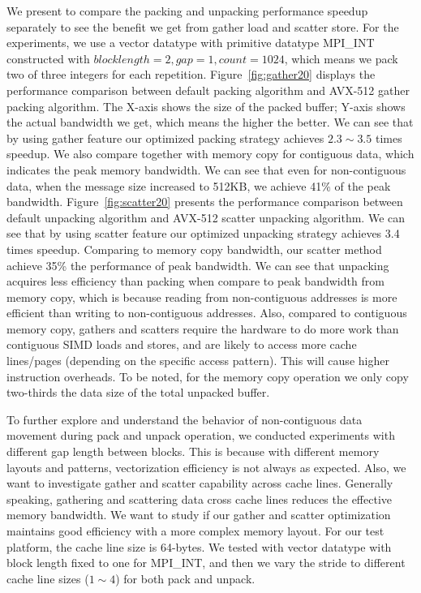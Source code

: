 \documentclass[conference]{IEEEtran}
\begin{document}
We present to compare the packing and unpacking performance speedup separately to see the benefit we get from gather load and scatter store. For the experiments, we use a vector datatype with primitive datatype MPI\_INT constructed with $block length = 2, gap = 1, count = 1024$, which means we pack two of three integers for each repetition.
Figure~\ref{fig:gather20} displays the performance comparison between \ompi default packing algorithm and AVX-512 gather packing algorithm. The X-axis shows the size of the packed buffer; Y-axis shows the actual bandwidth we get, which means the higher the better. We can see that by using gather feature our optimized packing strategy achieves $2.3 \sim 3.5$ times speedup. We also compare together with memory copy for contiguous data, which indicates the peak memory bandwidth. We can see that even for non-contiguous data, when the message size increased to 512KB, we achieve 41\% of the peak bandwidth.
Figure~\ref{fig:scatter20} presents the performance comparison between \ompi default unpacking algorithm and AVX-512 scatter unpacking algorithm. We can see that by using scatter feature our optimized unpacking strategy achieves 3.4 times speedup. Comparing to memory copy
bandwidth, our scatter method achieve 35\% the performance of peak bandwidth. We can see that unpacking acquires less efficiency than packing when compare to peak bandwidth from memory copy, which is because reading from non-contiguous addresses is more efficient than writing to non-contiguous addresses.
Also, compared to contiguous memory copy, gathers and scatters require the hardware to do more work than contiguous SIMD loads and stores, and are likely to access more cache lines/pages (depending on the specific access pattern). This will cause higher instruction overheads.
To be noted, for the memory copy operation we only copy two-thirds the data size of the total unpacked buffer.

To further explore and understand the behavior of non-contiguous data movement during pack and unpack operation,
we conducted experiments with different gap length between blocks. This is because with different memory layouts and patterns, vectorization efficiency is not always as expected. Also, we want to investigate gather and scatter capability across cache lines. Generally speaking, gathering and scattering data cross cache lines reduces the effective memory bandwidth.
We want to study if our gather and scatter optimization maintains good efficiency with a more complex memory layout.
For our test platform, the cache line size is 64-bytes. We tested with vector datatype with block length fixed to one for MPI\_INT, and then we vary the stride to different cache line sizes ($1 \sim 4$) for both pack and unpack.
\end{document}
